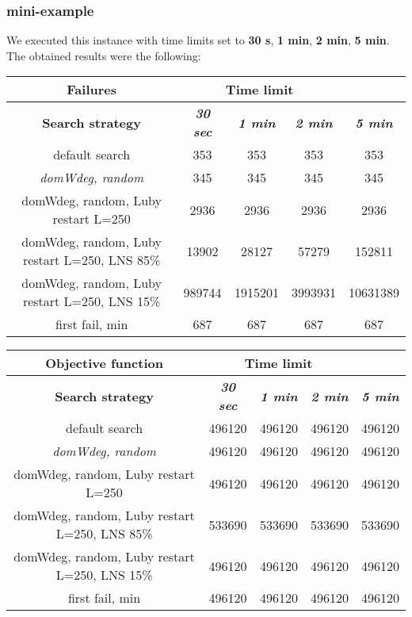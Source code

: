 \subsubsection{mini-example}
We executed this instance with time limits set to \textbf{30 s}, \textbf{1 min}, \textbf{2 min}, \textbf{5 min}.\\
The obtained results were the following:
{
\renewcommand{\arraystretch}{2}
\begin{longtable}[h]{| c | c | c | c | c |}
    \hline
    \textbf{Failures} & \multicolumn{3}{c}{Time limit} & \\
    \hline
    \textbf{Search strategy} & \textbf{\textit{30 sec}} & \textbf{\textit{1 min}} & \textbf{\textit{2 min}} & \textbf{\textit{5 min}} \\
    \hline
    \endhead
    default search                                &    353 &     353 &     353 &      353 \\
    \hline
    \textit{domWdeg, random}                      &    345 &     345 &     345 &      345 \\
    \hline
    domWdeg, random, Luby restart L=250           &   2936 &    2936 &    2936 &     2936 \\
    \hline
    domWdeg, random, Luby restart L=250, LNS 85\% &  13902 &   28127 &   57279 &   152811 \\
    \hline
    domWdeg, random, Luby restart L=250, LNS 15\% & 989744 & 1915201 & 3993931 & 10631389 \\
    \hline
    first fail, min                               &    687 &     687 &     687 &      687 \\
    \hline
\end{longtable}
}

{
\renewcommand{\arraystretch}{2}
\begin{longtable}[h]{| c | c | c | c | c |}
    \hline
    \textbf{Objective function} & \multicolumn{3}{c}{Time limit} & \\
    \hline
    \textbf{Search strategy} & \textbf{\textit{30 sec}} & \textbf{\textit{1 min}} & \textbf{\textit{2 min}} & \textbf{\textit{5 min}} \\
    \hline
    \endhead
    default search                                & 496120 & 496120 & 496120 & 496120 \\
    \hline
    \textit{domWdeg, random}                      & 496120 & 496120 & 496120 & 496120 \\
    \hline
    domWdeg, random, Luby restart L=250           & 496120 & 496120 & 496120 & 496120 \\
    \hline
    domWdeg, random, Luby restart L=250, LNS 85\% & 533690 & 533690 & 533690 & 533690 \\
    \hline
    domWdeg, random, Luby restart L=250, LNS 15\% & 496120 & 496120 & 496120 & 496120 \\
    \hline
    first fail, min                               & 496120 & 496120 & 496120 & 496120 \\
    \hline
\end{longtable}
}